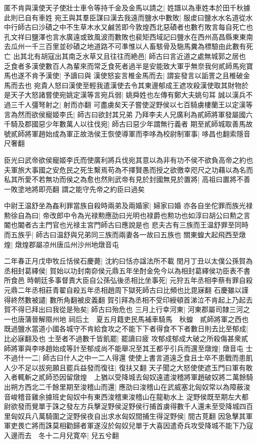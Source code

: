 匿不肯與漢使天子使壯士車令等持千金及金馬以請之|{
	姓譜以為車姓本於田千秋據此則已自有車姓}
宛王與其羣臣謀曰漢去我遠而鹽水中數敗|{
	服䖍曰鹽水水名道從水中行師古曰沙磧之中不生草木水又鹹苦即今敦煌西北惡磧者也數冇敗言每自死亡也孔文祥曰鹽澤也言水廣遠或致風波而數敗也裴矩西域記曰鹽水在西州高昌縣東東南去瓜州一千三百里並砂磧之地道路不可凖惟以人畜駭骨及駞馬糞為標驗由此數有死亡}
出其北有胡寇出其南乏水草又且往往而絶邑|{
	師古曰言近道之處無城郭之居也}
乏食者多漢使數百人為輩來而常乏食死者過半是安能致大軍乎無奈我何貳師馬宛寶馬也遂不肯予漢使|{
	予讀曰與}
漢使怒妄言椎金馬而去|{
	謂妄發言以詬詈之且椎破金馬而去也}
宛貴人怒曰漢使至輕我遣漢使去令其東邊郁成王遮攻殺漢使取其財物於是天子大怒諸嘗使宛姚定漢等言宛兵弱|{
	姚舜姓也左傳有鄭大夫姚句耳}
誠以漢兵不過三千人彊弩射之|{
	射而亦翻}
可盡虜矣天子嘗使浞野侯以七百騎虜樓蘭王以定漢等言為然而欲侯寵姬李氏|{
	師古曰欲封其兄弟}
乃拜李夫人兄廣利為貳師將軍發屬國六千騎及郡國惡少年數萬人以往伐宛|{
	師古曰惡少年謂無行義者}
期至貳師城取善馬故號貳師將軍趙始成為軍正故浩侯王恢使導軍而李哆為校尉制軍事|{
	哆昌也翻索隱音尺奢翻}


臣光曰武帝欲侯寵姬李氏而使廣利將兵伐宛其意以為非有功不侯不欲負高帝之約也夫軍旅大事國之安危民之死生繫焉苟為不擇賢愚而授之欲徼幸咫尺之功藉以為名而私其所愛不若無功而侯之為愈也然則武帝有見於封國無見於置將|{
	高祖曰置將不善一敗塗地將即亮翻}
謂之能守先帝之約臣曰過矣

中尉王温舒坐為姦利罪當族自殺時兩弟及兩婚家|{
	婦家曰婚}
亦各自坐佗罪而族光禄勲徐自為曰|{
	帝改郎中令為光禄勲應劭曰光明也禄爵也勲功也如淳曰胡公曰勲之言閽也閽者古主門官也光禄主宮門師古曰應說是也}
悲夫古有三族而王温舒罪至同時而五族乎|{
	師古曰温舒與兄弟同三族而兩妻各一故曰五族也}
關東蝗大起飛西至燉煌|{
	燉煌郡屬凉州唐瓜州沙州地燉音屯}


二年春正月戊申牧丘恬侯石慶薨|{
	沈約曰恬亦諡法所不載}
閏月丁丑以太僕公孫賀為丞相封葛繹侯|{
	賀始以功封南奅侯元鼎五年坐酎金免今以為相封葛繹侯功臣表不書所食邑}
時朝廷多事督責大臣自公孫弘後丞相比坐事死|{
	元狩五年丞相李蔡有罪自殺元鼎二年丞相莊青翟自殺五年丞相趙周下獄死師古曰比頻也比毘寐翻}
石慶雖以謹得終然數被譴|{
	數所角翻被皮義翻}
賀引拜為丞相不受印綬頓首涕泣不肯起上乃起去賀不得已拜出曰我從是殆矣|{
	師古曰殆危也}
三月上行幸河東|{
	河東郡屬司隸三河之一也唐蒲晉解隰州地}
祠后土　夏五月籍吏民馬補車騎馬　秋蝗　貳師將軍之西也既過鹽水當道小國各城守不肯給食攻之不能下下者得食不下者數日則去比至郁成|{
	比必寐翻及也}
士至者不過數千皆飢罷|{
	罷讀曰疲}
攻郁成郁成大破之所殺傷甚衆貳師將軍與李哆趙始成等計至郁成尚不能舉况至其王都乎引兵而還至燉煌|{
	燉音屯}
士不過什一二|{
	師古曰什人之中一二人得還}
使使上書言道遠乏食且士卒不患戰而患飢人少不足以拔宛願且罷兵益發而復往|{
	復扶又翻}
天子聞之大怒使使遮玉門曰軍有敢入者輒斬之貳師恐因留燉煌　上猶以受降城去匈奴遠遣浚稽將軍趙破奴將二萬餘騎出朔方西北二千餘里期至浚稽山而還|{
	應劭曰浚稽山在武威塞北匈奴常以為障蔽浚音峻稽音雞余據班史匈奴中有東西浚稽東浚稽山在龍勒水上}
浞野侯既至期左大都尉欲發而覺單于誅之發左方兵擊浞野侯浞野侯行捕首虜得數千人還未至受降城四百里匈奴兵八萬騎圍之浞野侯夜自出求水匈奴間捕生得浞野侯|{
	間古莧翻}
因急擊其軍軍吏畏亡將而誅莫相勸歸者軍遂沒於匈奴兒單于大喜因遣奇兵攻受降城不能下乃寇入邊而去　冬十二月兒寛卒|{
	兒五兮翻}


